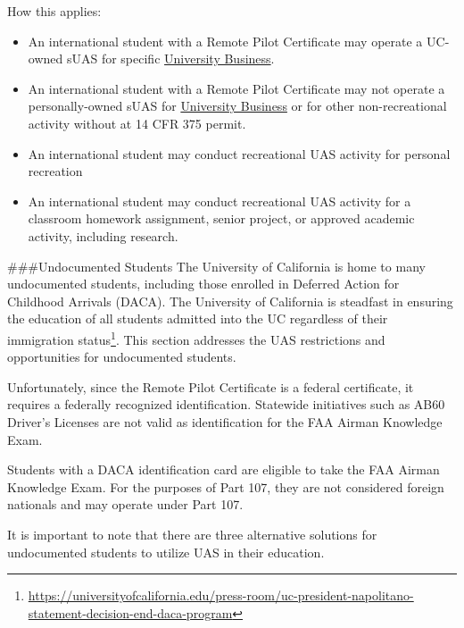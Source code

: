 \documentclass[
]{book}
\providecommand{\tightlist}{%
  \setlength{\itemsep}{0pt}\setlength{\parskip}{0pt}}
\begin{document}
How this applies:

\begin{itemize}
\tightlist
\item
  An international student with a Remote Pilot Certificate may operate a UC-owned sUAS for specific \protect\hyperlink{UB}{University Business}.
\item
  An international student with a Remote Pilot Certificate may not operate a personally-owned sUAS for \protect\hyperlink{UB}{University Business} or for other non-recreational activity without at 14 CFR 375 permit.
\item
  An international student may conduct recreational UAS activity for personal recreation
\item
  An international student may conduct recreational UAS activity for a classroom homework assignment, senior project, or approved academic activity, including research.
\end{itemize}

\#\#\#Undocumented Students
The University of California is home to many undocumented students, including those enrolled in Deferred Action for Childhood Arrivals (DACA). The University of California is steadfast in ensuring the education of all students admitted into the UC regardless of their immigration status\footnote{\url{https://universityofcalifornia.edu/press-room/uc-president-napolitano-statement-decision-end-daca-program}}. This section addresses the UAS restrictions and opportunities for undocumented students.

Unfortunately, since the Remote Pilot Certificate is a federal certificate, it requires a federally recognized identification. Statewide initiatives such as AB60 Driver's Licenses are not valid as identification for the FAA Airman Knowledge Exam.

Students with a DACA identification card are eligible to take the FAA Airman Knowledge Exam. For the purposes of Part 107, they are not considered foreign nationals and may operate under Part 107.

It is important to note that there are three alternative solutions for undocumented students to utilize UAS in their education.
\end{document}
